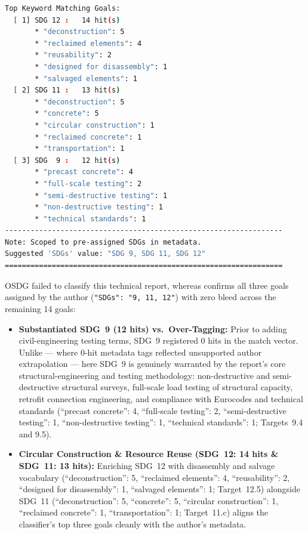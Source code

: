 \begin{casestudySection}
\begin{lstlisting}[language={bash}, basicstyle=\footnotesize, escapechar=|, breaklines=true,
    postbreak=\usebox{\lstbreakbox}, caption={Program's output}, label=lst:t_21258Output]
Top Keyword Matching Goals:
  [ 1] SDG 12 :   14 hit(s)
       * "deconstruction": 5
       * "reclaimed elements": 4
       * "reusability": 2
       * "designed for disassembly": 1
       * "salvaged elements": 1
  [ 2] SDG 11 :   13 hit(s)
       * "deconstruction": 5
       * "concrete": 5
       * "circular construction": 1
       * "reclaimed concrete": 1
       * "transportation": 1
  [ 3] SDG  9 :   12 hit(s)
       * "precast concrete": 4
       * "full-scale testing": 2
       * "semi-destructive testing": 1
       * "non-destructive testing": 1
       * "technical standards": 1
-----------------------------------------------------------------
Note: Scoped to pre-assigned SDGs in metadata.
Suggested 'SDGs' value: "SDG 9, SDG 11, SDG 12"
=================================================================
\end{lstlisting}

OSDG failed to classify this technical report, whereas  confirms all three goals assigned by the author (\texttt{"SDGs": "9, 11, 12"}) with zero bleed across the remaining \num{14} goals:
\begin{itemize}
    \item \textbf{Substantiated \gls{SDG}~9 (\num{12} hits) vs.\ Over-Tagging:} Prior to adding civil-engineering testing terms, \gls{SDG}~9 registered \num{0} hits in the match vector. Unlike  --- where \num{0}-hit metadata tags reflected unsupported author extrapolation --- here \gls{SDG}~9 is genuinely warranted by the report's core structural-engineering and testing methodology: non-destructive and semi-destructive structural surveys, full-scale load testing of structural capacity, retrofit connection engineering, and compliance with Eurocodes and technical standards (\enquote{precast concrete}: 4, \enquote{full-scale testing}: 2, \enquote{semi-destructive testing}: 1, \enquote{non-destructive testing}: 1, \enquote{technical standards}: 1; Targets~9.4 and 9.5).
    
    \item \textbf{Circular Construction \& Resource Reuse (\gls{SDG}~12: \num{14} hits \& \gls{SDG}~11: \num{13} hits):} Enriching \gls{SDG}~12 with disassembly and salvage vocabulary (\enquote{deconstruction}: 5, \enquote{reclaimed elements}: 4, \enquote{reusability}: 2, \enquote{designed for disassembly}: 1, \enquote{salvaged elements}: 1; Target~12.5) alongside \gls{SDG}~11 (\enquote{deconstruction}: 5, \enquote{concrete}: 5, \enquote{circular construction}: 1, \enquote{reclaimed concrete}: 1, \enquote{transportation}: 1; Target~11.c) aligns the classifier's top three goals cleanly with the author's metadata.
\end{itemize}
\end{casestudySection}

